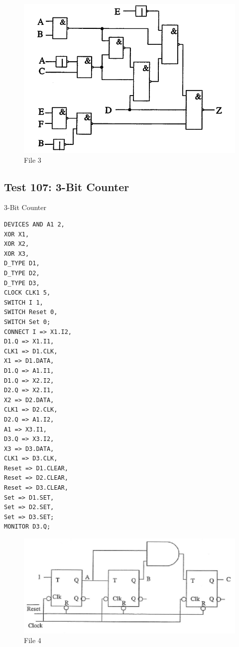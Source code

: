 \documentclass[12pt]{article}
\begin{document}
\begin{figure}[H]
	\centering
	\includegraphics[width=0.9\linewidth]{figures/Test104.png}
	\captionsetup{width=.7\linewidth}
	\caption{File 3}
	\label{fig:5}
\end{figure}


\subsection{Test 107: 3-Bit Counter}
3-Bit Counter\\
\begin{verbatim}
DEVICES	AND A1 2,
XOR X1,
XOR X2,
XOR X3,
D_TYPE D1,
D_TYPE D2,
D_TYPE D3,
CLOCK CLK1 5,
SWITCH I 1,
SWITCH Reset 0,
SWITCH Set 0;
CONNECT	I => X1.I2,
D1.Q => X1.I1,
CLK1 => D1.CLK,
X1 => D1.DATA,
D1.Q => A1.I1,
D1.Q => X2.I2,
D2.Q => X2.I1,
X2 => D2.DATA,
CLK1 => D2.CLK,
D2.Q => A1.I2,
A1 => X3.I1,
D3.Q => X3.I2,
X3 => D3.DATA,
CLK1 => D3.CLK,
Reset => D1.CLEAR,
Reset => D2.CLEAR,
Reset => D3.CLEAR,
Set => D1.SET,
Set => D2.SET,
Set => D3.SET;
MONITOR	D3.Q;
\end{verbatim}
\begin{figure}[H]
	\centering
	\includegraphics[width=0.9\linewidth]{figures/test107.png}
	\captionsetup{width=.7\linewidth}
	\caption{File 4}
	\label{fig:6}
\end{figure}
\end{document}
